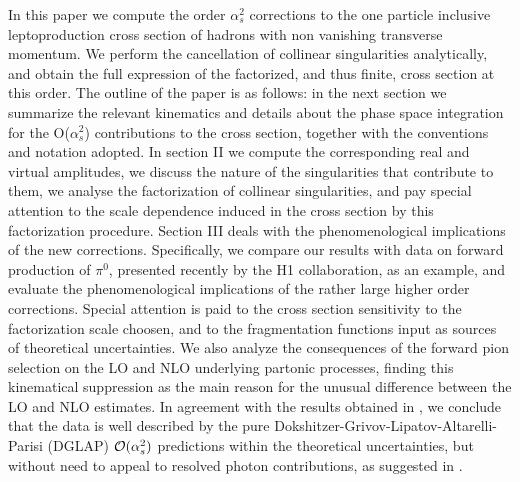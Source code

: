 \documentclass[superscriptaddress,showkeys,showpacs]{revtex4}
\begin{document}
In this paper we compute the order $\alpha_s^2$ corrections to the one 
particle inclusive leptoproduction cross section of hadrons with non 
vanishing transverse momentum. We perform the cancellation of collinear 
singularities analytically, and obtain the full expression of the 
factorized, and thus finite, cross section at this order. 
The outline of the paper is as follows: in the next section we summarize 
the relevant kinematics and details about the phase space integration for 
the O($\alpha_s^2$) contributions to the cross section, together with the 
conventions and notation adopted.
In section II we compute the corresponding real and virtual amplitudes, 
we discuss the nature of the singularities that contribute to them,  we 
analyse the factorization of collinear singularities, 
and pay special attention to the scale dependence induced in the cross 
section by this factorization procedure.
Section III deals with the phenomenological implications of the new 
corrections. 
Specifically, we compare our results with data on forward production of 
$\pi^0$, presented recently by the H1 collaboration, as an example, and 
evaluate the phenomenological implications of the rather large higher order 
corrections. Special attention is paid to the cross section sensitivity to 
the factorization scale choosen, and to the fragmentation functions input as
sources of theoretical uncertainties.  We also analyze the consequences of the 
forward pion selection on the LO and NLO underlying partonic processes, 
finding this kinematical suppression as the main reason for the 
unusual difference between the LO and NLO estimates. 
In agreement with the results obtained in \cite{aure}, we conclude that the 
data is well described by the pure Dokshitzer-Grivov-Lipatov-Altarelli-Parisi (DGLAP) ${\cal{O}}(\alpha_s^2)$ predictions 
within the theoretical uncertainties, but without need to appeal to resolved 
photon contributions, as suggested in  \cite{Fontannaz:2004ev}.
   



\end{document}

